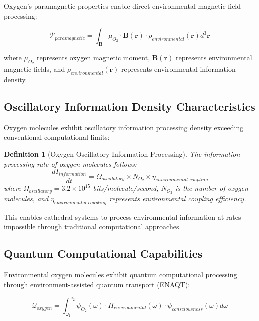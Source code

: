 \documentclass[12pt,a4paper]{article}
\newtheorem{definition}{Definition}
\begin{document}
Oxygen's paramagnetic properties enable direct environmental magnetic field processing:

\begin{equation}
\mathcal{P}_{paramagnetic} = \int_{\mathbf{B}} \mu_{O_2} \cdot \mathbf{B}(\mathbf{r}) \cdot \rho_{environmental}(\mathbf{r}) d^3\mathbf{r}
\end{equation}

where $\mu_{O_2}$ represents oxygen magnetic moment, $\mathbf{B}(\mathbf{r})$ represents environmental magnetic fields, and $\rho_{environmental}(\mathbf{r})$ represents environmental information density.

\subsection{Oscillatory Information Density Characteristics}

Oxygen molecules exhibit oscillatory information processing density exceeding conventional computational limits:

\begin{definition}[Oxygen Oscillatory Information Processing]
The information processing rate of oxygen molecules follows:
\begin{equation}
\frac{dI_{information}}{dt} = \Omega_{oscillatory} \times N_{O_2} \times \eta_{environmental\_coupling}
\end{equation}
where $\Omega_{oscillatory} = 3.2 \times 10^{15}$ bits/molecule/second, $N_{O_2}$ is the number of oxygen molecules, and $\eta_{environmental\_coupling}$ represents environmental coupling efficiency.
\end{definition}

This enables cathedral systems to process environmental information at rates impossible through traditional computational approaches.

\subsection{Quantum Computational Capabilities}

Environmental oxygen molecules exhibit quantum computational processing through environment-assisted quantum transport (ENAQT):

\begin{equation}
\mathcal{Q}_{oxygen} = \int_{\omega_1}^{\omega_2} \psi_{O_2}(\omega) \cdot H_{environmental}(\omega) \cdot \psi_{consciousness}(\omega) d\omega
\end{equation}
\end{document}
